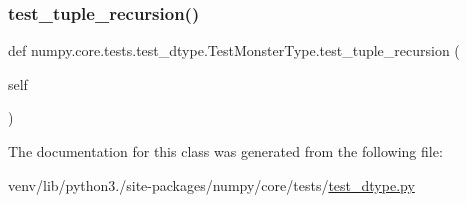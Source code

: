 \mbox{\label{classnumpy_1_1core_1_1tests_1_1test__dtype_1_1TestMonsterType_a980f884b5f0cc1eae2bbb0b7af1e9773}} 
\subsubsection{\texorpdfstring{test\+\_\+tuple\+\_\+recursion()}{test\_tuple\_recursion()}}
{\footnotesize\ttfamily def numpy.\+core.\+tests.\+test\+\_\+dtype.\+Test\+Monster\+Type.\+test\+\_\+tuple\+\_\+recursion (\begin{DoxyParamCaption}\item[{}]{self }\end{DoxyParamCaption})}



The documentation for this class was generated from the following file\+:\begin{DoxyCompactItemize}
\item 
venv/lib/python3./site-\/packages/numpy/core/tests/\hyperlink{test__dtype_8py}{test\+\_\+dtype.\+py}\end{DoxyCompactItemize}
